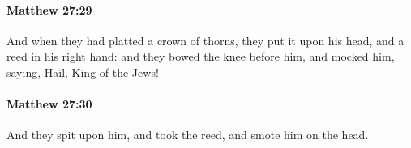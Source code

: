 		\paragraph{Matthew 27:29} %
			\label{MATTHEW-27-29}

			And when they had platted a crown of thorns, they put it upon his head, and a reed in his right hand: and they bowed the knee before him, and mocked him, saying, Hail, King of the Jews!

			\begin{framed}
			\scriptsize
				\begin{compactdesc}
					\item[SBLG] 
				\end{compactdesc}
			\end{framed}

		\paragraph{Matthew 27:30} %
			\label{MATTHEW-27-30}

			And they spit upon him, and took the reed, and smote him on the head.

